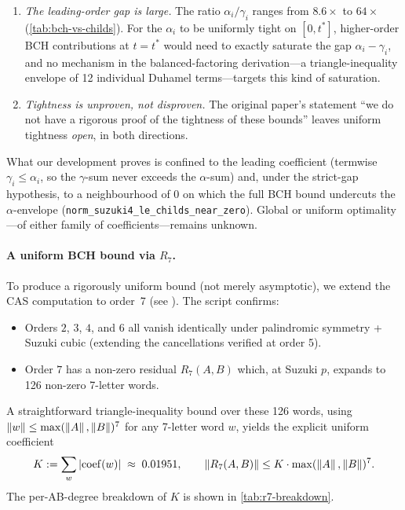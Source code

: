 \begin{enumerate}[leftmargin=*]
  \item \emph{The leading-order gap is large.} The ratio
    $\alpha_i / \gamma_i$ ranges from $8.6\times$ to $64\times$
    (\cref{tab:bch-vs-childs}). For the $\alpha_i$ to be uniformly tight on
    $[0, t^*]$, higher-order BCH contributions at $t = t^*$ would need
    to exactly saturate the gap $\alpha_i - \gamma_i$, and
    no mechanism in the balanced-factoring derivation---a
    triangle-inequality
    envelope of 12 individual Duhamel terms---targets this kind of
    saturation.

  \item \emph{Tightness is unproven, not disproven.} The original paper's
    statement ``we do not have a rigorous proof of the tightness of these
    bounds'' leaves uniform tightness \emph{open}, in both directions.
\end{enumerate}

What our development proves is confined to the leading coefficient
(termwise $\gamma_i \le \alpha_i$, so the $\gamma$-sum never exceeds the
$\alpha$-sum) and, under the strict-gap hypothesis, to a neighbourhood of
$0$ on which the full BCH bound undercuts the $\alpha$-envelope
(\texttt{norm\_suzuki4\_le\_childs\_near\_zero}). Global or uniform
optimality---of either family of coefficients---remains unknown.

\paragraph{A uniform BCH bound via \texorpdfstring{$R_7$}{R7}.}
To produce a rigorously uniform bound (not merely asymptotic), we extend
the CAS computation to order~7 (see
). The
script confirms:
\begin{itemize}[nosep]
  \item Orders $2$, $3$, $4$, and $6$ all vanish identically under
    palindromic symmetry + Suzuki cubic (extending the cancellations
    verified at order 5).
  \item Order $7$ has a non-zero residual $R_7(A, B)$ which, at Suzuki $p$,
    expands to 126 non-zero 7-letter words.
\end{itemize}
A straightforward triangle-inequality bound over these 126 words, using
$\left\|w\right\| \le \max(\left\|A\right\|, \left\|B\right\|)^7$ for any 7-letter word $w$, yields
the explicit uniform coefficient
\begin{equation}\label{eq:r7-K}
  K := \sum_{w} \left|\mathrm{coef}(w)\right| \;\approx\; 0.01951,
  \qquad
  \left\|R_7(A, B)\right\| \le K \cdot \max(\left\|A\right\|, \left\|B\right\|)^7.
\end{equation}
The per-AB-degree breakdown of $K$ is shown in \cref{tab:r7-breakdown}.

